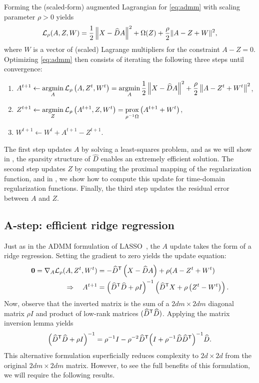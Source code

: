 \documentclass{article} %
\begin{document}
Forming the (scaled-form) augmented Lagrangian for \eqref{eq:admm} with scaling
parameter $\rho > 0 $ yields
\[
\mathcal{L}_\rho(A,Z,W) = \frac{1}{2}\left\|X - \widehat{D}A\right\|^2 + \Omega(Z) +
\frac{\rho}{2}\|A - Z + W\|^2,
\]
where $W$ is a vector of (scaled) Lagrange multipliers for the constraint $A-Z=0$.
Optimizing \eqref{eq:admm} then consists of iterating the following three steps until
convergence:
\begin{enumerate}
\item $\displaystyle A^{t+1} \leftarrow \operatorname*{argmin}_A \mathcal{L}_\rho\left(A, Z^t, W^t\right) = \operatorname*{argmin}_A \frac{1}{2}
\left\|X - \widehat{D}A\right\|^2 + \frac{\rho}{2}\left\|A - Z^t + W^t\right\|^2$,
\item $\displaystyle Z^{t+1} \leftarrow \operatorname*{argmin}_Z \mathcal{L}_\rho\left(A^{t+1}, Z, W^t\right) =
\operatorname*{prox}_{\rho^{-1}\Omega}\left(A^{t+1} + W^t \right)$,
\item $W^{t+1} \leftarrow W^t + A^{t+1} - Z^{t+1}$.
\end{enumerate}

The first step updates $A$ by solving a least-squares problem, and as we will show in
, the sparsity structure of $\widehat{D}$ enables an extremely
efficient solution.  The second step updates $Z$ by computing the proximal mapping of
the regularization function, and in , we show how to compute this
update for time-domain regularization functions.  Finally, the third step updates the
residual error between $A$ and $Z$.

\subsection{A-step: efficient ridge regression}
\label{sec:astep}
Just as in the ADMM formulation of LASSO~\cite[chapter 6.4]{boyd2011}, the $A$ update 
takes the form of a ridge regression.  Setting the gradient to zero yields the update
equation:
\begin{align}
\mathbf{0} = \nabla_A \mathcal{L}_\rho(A, Z^t, W^t) &= -\widehat{D}^\mathsf{T} \left(X - \widehat{D}A\right)
+ \rho(A - Z^t + W^t)\notag\\
\Rightarrow \quad A^{t+1} &= {\left(\widehat{D}^\mathsf{T} \widehat{D} + \rho I\right)}^{-1}
\left(\widehat{D}^\mathsf{T} X + \rho \left(Z^t - W^t\right)\right).\label{eq:a-update}
\end{align}
Now, observe that the inverted matrix is the sum of a $2dm\times 2dm$ diagonal matrix 
$\rho I$ and product of low-rank matrices $(\widehat{D}^\mathsf{T}\widehat{D})$.  
Applying the matrix inversion lemma yields
\begin{equation}
{\left(\widehat{D}\ensuremath{^\mathsf{T}}\widehat{D} + \rho I\right)}^{-1} = \rho^{-1} I - \rho^{-2} \widehat{D}^\mathsf{T}
{\left(I + \rho^{-1} \widehat{D}\widehat{D}^\mathsf{T} \right)}^{-1}
\widehat{D}.\label{eq:inversion}
\end{equation}
This alternative formulation superficially reduces complexity to $2d\times 2d$
from the original $2dm\times 2dm$ matrix.  However, to see the full
benefits of this formulation, we will require the following results.
\end{document}
